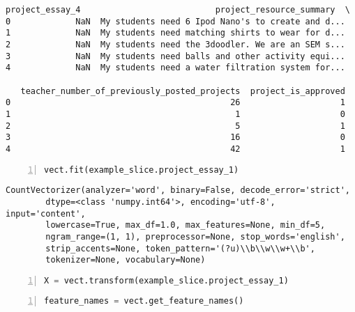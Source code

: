 \documentclass[10pt,parskip=half,
	toc=sectionentrywithdots,
	bibliography=totocnumbered,
	captions=tableheading,numbers=noendperiod]{scrartcl}
\begin{document}
\begin{lstlisting}[language={},postbreak={},numbers=none,xrightmargin=7pt,breakindent=0pt,aboveskip=5pt,belowskip=5pt]
  project_essay_4                           project_resource_summary  \
0             NaN  My students need 6 Ipod Nano's to create and d...   
1             NaN  My students need matching shirts to wear for d...   
2             NaN  My students need the 3doodler. We are an SEM s...   
3             NaN  My students need balls and other activity equi...   
4             NaN  My students need a water filtration system for...   

   teacher_number_of_previously_posted_projects  project_is_approved  
0                                            26                    1  
1                                             1                    0  
2                                             5                    1  
3                                            16                    0  
4                                            42                    1  
\end{lstlisting}

\begin{lstlisting}[language=Python,numbers=left,xleftmargin=20pt,xrightmargin=5pt,belowskip=5pt,aboveskip=5pt]
vect.fit(example_slice.project_essay_1)
\end{lstlisting}

\begin{lstlisting}[language={},postbreak={},numbers=none,xrightmargin=7pt,breakindent=0pt,aboveskip=5pt,belowskip=5pt]
CountVectorizer(analyzer='word', binary=False, decode_error='strict',
        dtype=<class 'numpy.int64'>, encoding='utf-8', input='content',
        lowercase=True, max_df=1.0, max_features=None, min_df=5,
        ngram_range=(1, 1), preprocessor=None, stop_words='english',
        strip_accents=None, token_pattern='(?u)\\b\\w\\w+\\b',
        tokenizer=None, vocabulary=None)
\end{lstlisting}

\begin{lstlisting}[language=Python,numbers=left,xleftmargin=20pt,xrightmargin=5pt,belowskip=5pt,aboveskip=5pt]
X = vect.transform(example_slice.project_essay_1)
\end{lstlisting}

\begin{lstlisting}[language=Python,numbers=left,xleftmargin=20pt,xrightmargin=5pt,belowskip=5pt,aboveskip=5pt]
feature_names = vect.get_feature_names()
\end{lstlisting}
\end{document}
